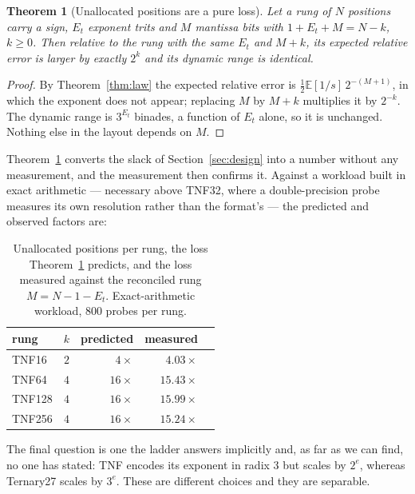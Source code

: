 \documentclass[11pt]{article}
\newtheorem{theorem}{Theorem}
\theoremstyle{definition}
\begin{document}
\begin{theorem}[Unallocated positions are a pure loss]
\label{thm:alloc}
Let a rung of $N$ positions carry a sign, $E_t$ exponent trits and $M$ mantissa
bits with $1 + E_t + M = N - k$, $k \geq 0$. Then relative to the rung with the
same $E_t$ and $M + k$, its expected relative error is larger by exactly $2^{k}$
and its dynamic range is identical.
\end{theorem}

\begin{proof}
By Theorem~\ref{thm:law} the expected relative error is
$\tfrac12 \mathbb{E}[1/s]\,2^{-(M+1)}$, in which the exponent does not appear;
replacing $M$ by $M+k$ multiplies it by $2^{-k}$. The dynamic range is
$3^{E_t}$ binades, a function of $E_t$ alone, so it is unchanged. Nothing else in
the layout depends on $M$.
\end{proof}

Theorem~\ref{thm:alloc} converts the slack of Section~\ref{sec:design} into a
number without any measurement, and the measurement then confirms it. Against a
workload built in exact arithmetic --- necessary above TNF32, where a
double-precision probe measures its own resolution rather than the format's ---
the predicted and observed factors are:

\begin{table}[t]\centering
\caption{Unallocated positions per rung, the loss Theorem~\ref{thm:alloc}
predicts, and the loss measured against the reconciled rung
$M = N - 1 - E_t$. Exact-arithmetic workload, 800 probes per rung.}
\label{tab:alloc}
\begin{tabular}{lrrrr}
\toprule
rung & $k$ & predicted & measured \\
\midrule
TNF16  & $2$ & $4\times$  & $4.03\times$  \\
TNF64  & $4$ & $16\times$ & $15.43\times$ \\
TNF128 & $4$ & $16\times$ & $15.99\times$ \\
TNF256 & $4$ & $16\times$ & $15.24\times$ \\
\bottomrule
\end{tabular}
\end{table}

The final question is one the ladder answers implicitly and, as far as we can
find, no one has stated: TNF encodes its exponent in radix 3 but scales by
$2^{e}$, whereas Ternary27 scales by $3^{e}$. These are different choices and
they are separable.
\end{document}
